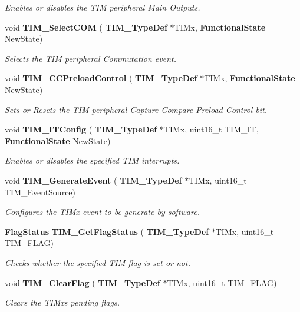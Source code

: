 \begin{DoxyCompactItemize}
\begin{DoxyCompactList}\small\item\em Enables or disables the T\+IM peripheral Main Outputs. \end{DoxyCompactList}\item 
void \textbf{ T\+I\+M\+\_\+\+Select\+C\+OM} (\textbf{ T\+I\+M\+\_\+\+Type\+Def} $\ast$T\+I\+Mx, \textbf{ Functional\+State} New\+State)
\begin{DoxyCompactList}\small\item\em Selects the T\+IM peripheral Commutation event. \end{DoxyCompactList}\item 
void \textbf{ T\+I\+M\+\_\+\+C\+C\+Preload\+Control} (\textbf{ T\+I\+M\+\_\+\+Type\+Def} $\ast$T\+I\+Mx, \textbf{ Functional\+State} New\+State)
\begin{DoxyCompactList}\small\item\em Sets or Resets the T\+IM peripheral Capture Compare Preload Control bit. \end{DoxyCompactList}\item 
void \textbf{ T\+I\+M\+\_\+\+I\+T\+Config} (\textbf{ T\+I\+M\+\_\+\+Type\+Def} $\ast$T\+I\+Mx, uint16\+\_\+t T\+I\+M\+\_\+\+IT, \textbf{ Functional\+State} New\+State)
\begin{DoxyCompactList}\small\item\em Enables or disables the specified T\+IM interrupts. \end{DoxyCompactList}\item 
void \textbf{ T\+I\+M\+\_\+\+Generate\+Event} (\textbf{ T\+I\+M\+\_\+\+Type\+Def} $\ast$T\+I\+Mx, uint16\+\_\+t T\+I\+M\+\_\+\+Event\+Source)
\begin{DoxyCompactList}\small\item\em Configures the T\+I\+Mx event to be generate by software. \end{DoxyCompactList}\item 
\textbf{ Flag\+Status} \textbf{ T\+I\+M\+\_\+\+Get\+Flag\+Status} (\textbf{ T\+I\+M\+\_\+\+Type\+Def} $\ast$T\+I\+Mx, uint16\+\_\+t T\+I\+M\+\_\+\+F\+L\+AG)
\begin{DoxyCompactList}\small\item\em Checks whether the specified T\+IM flag is set or not. \end{DoxyCompactList}\item 
void \textbf{ T\+I\+M\+\_\+\+Clear\+Flag} (\textbf{ T\+I\+M\+\_\+\+Type\+Def} $\ast$T\+I\+Mx, uint16\+\_\+t T\+I\+M\+\_\+\+F\+L\+AG)
\begin{DoxyCompactList}\small\item\em Clears the T\+I\+Mx\textquotesingle{}s pending flags. \end{DoxyCompactList}\item 

\end{DoxyCompactItemize}
